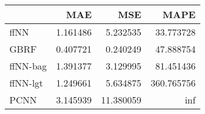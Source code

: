 \begin{tabular}{lrrr}
\toprule
{} &       MAE &        MSE &        MAPE \\
\midrule
ffNN     &  1.161486 &   5.232535 &   33.773728 \\
GBRF     &  0.407721 &   0.240249 &   47.888754 \\
ffNN-bag &  1.391377 &   3.129995 &   81.451436 \\
ffNN-lgt &  1.249661 &   5.634875 &  360.765756 \\
PCNN     &  3.145939 &  11.380059 &         inf \\
\bottomrule
\end{tabular}
